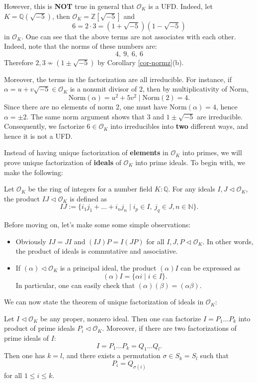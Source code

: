 However, this is {\bf NOT} true in general that $\mathcal{O}_K$ is a UFD. Indeed, let \( K = \mathbb{Q}(\sqrt{-5}) \), then \( \mathcal{O}_K = \mathbb{Z}[\sqrt{-5}] \) and 
\[ 6 = 2 \cdot 3 = (1 + \sqrt{-5})(1 - \sqrt{-5}) \]
in \( \mathcal{O}_K \). One can see that the above terms are not associates with each other. Indeed, note that the norms of these numbers are:
\[ 4, \ 9, \ 6, \ 6 \]
Therefore $2, 3 \nsim (1 \pm \sqrt{-5})$ by Corollary \ref{cor-normz}(b). 

Moreover, the terms in the factorization are all irreducible. For instance, if \( \alpha = u + v\sqrt{-5} \in \mathcal{O}_K \) is a nonunit divisor of $2$, then by multiplicativity of $\mathrm{Norm}$,
$$\mathrm{Norm}(\alpha) = u^2 + 5v^2 \mid \mathrm{Norm}(2) = 4.$$
Since there are no elements of norm $2$, one must have $\mathrm{Norm}(\alpha)=4$, hence $\alpha=\pm2$. The same norm argument shows that $3$ and $1\pm\sqrt{-5}$ are irreducible.
Consequently, we factorize $6 \in \mathcal{O}_K$ into irreducibles into {\bf two} different ways, and hence it is not a UFD.

\bigskip
Instead of having unique factorization of {\bf elements} in $\mathcal{O}_K$ into primes, we will prove unique factorization of {\bf ideals} of $\mathcal{O}_K$ into prime ideals. To begin with, we make the following:
\begin{definition}
    Let $\mathcal{O}_K$ be the ring of integers for a number field $K:\mathbb{Q}$. For any ideals $I, J \lhd \mathcal{O}_K$, the product $IJ \lhd \mathcal{O}_K$ is defined as
        $$IJ := \{i_1j_1 + \dots + i_nj_n \mid i_p \in I,\ j_q \in J, n \in \mathbb{N}\}.$$
\end{definition}
Before moving on, let's make some some simple observations:
\begin{itemize}
    \item Obviously $IJ = JI$ and $(IJ)P = I(JP)$ for all $I, J, P \lhd \mathcal{O}_K$. In other words, the product of ideals is commutative and associative.
    \item If $(\alpha) \lhd \mathcal{O}_K$ is a principal ideal, the product $(\alpha)I$ can be expressed as
    $$(\alpha)I = \{\alpha i \mid i \in I\}.$$
    In particular, one can easily check that $(\alpha)(\beta) = (\alpha \beta)$.
\end{itemize}
We can now state the theorem of unique factorization of ideals in $\mathcal{O}_K$:
\begin{theorem} \label{thm-dedekind}
    Let $I \lhd \mathcal{O}_K$ be any proper, nonzero ideal. Then one can factorize $I = P_1 \dots P_k$ into product of prime ideals $P_i \lhd \mathcal{O}_K$. Moreover, if there are two factorizations of prime ideals of $I$:
    $$I = P_1 \dots P_k = Q_1 \dots Q_l.$$
    Then one has $k = l$, and there exists a permutation $\sigma \in S_k = S_l$ such that
    $$P_i = Q_{\sigma(i)}$$
    for all $1 \leq i \leq k$.
    
\end{theorem}

